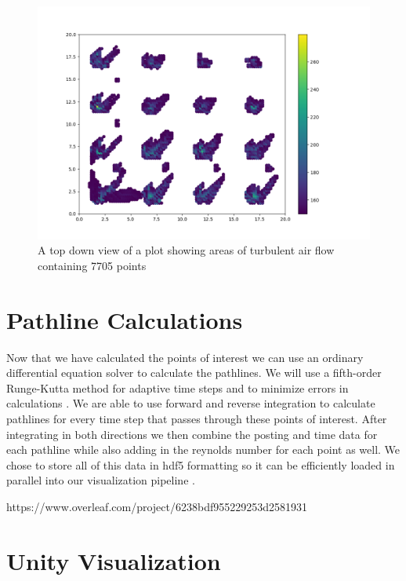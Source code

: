 \begin{figure}
\centering
\includegraphics[scale=.35]{Figures/Turb2D_4_11.png}
\decoRule
\caption[Turbulent Air Flow Scatter Plot]{A top down view of a plot showing areas of turbulent air flow containing 7705 points}
\label{fig:MTurbulentflow}
\end{figure}
\section{Pathline Calculations}

Now that we have calculated the points of interest we can use an ordinary differential equation solver to calculate the pathlines. We will use a fifth-order Runge-Kutta method for adaptive time steps and to minimize errors in calculations \cite{Teitzel1997}. We are able to use forward and reverse integration to calculate pathlines for every time step that passes through these points of interest. After integrating in both directions we then combine the posting and time data for each pathline while also adding in the reynolds number for each point as well. We chose to store all of this data in hdf5 formatting so it can be efficiently loaded in parallel into our visualization pipeline \cite{hdf5}.

https://www.overleaf.com/project/6238bdf955229253d2581931

\section{Unity Visualization}

